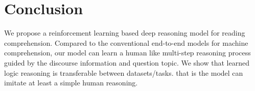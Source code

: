 \section{Conclusion}
We propose a reinforcement learning based deep reasoning model for reading comprehension. Compared to the conventional end-to-end models for machine comprehension, our model can learn a human like multi-step reasoning process guided by the discourse information and question topic.
 We show that learned logic reasoning is transferable between datasets/tasks. that is the model can imitate at least a simple human reasoning. 
